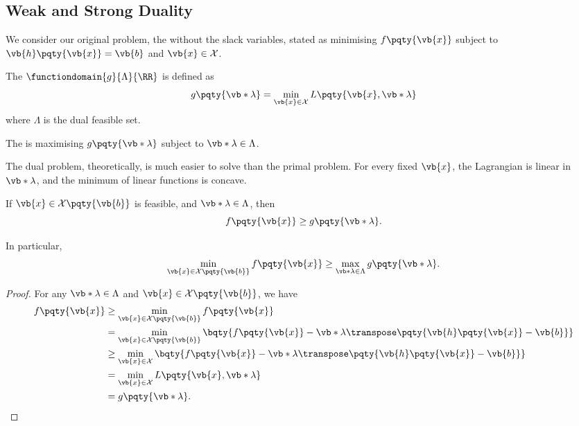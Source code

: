 \subsection{Weak and Strong Duality}

We consider our original problem, the  without the slack variables, stated as minimising \(f\pqty{\vb{x}}\) subject to \(\vb{h}\pqty{\vb{x}} = \vb{b}\) and \(\vb{x} \in \mathcal{X}\).

\begin{definition}
    The  \(\functiondomain{g}{\Lambda}{\RR}\) is defined as
    \[
        g\pqty{\vb*{\lambda}} = \min_{\vb{x} \in \mathcal{X}} L \pqty{\vb{x}, \vb*{\lambda}}
    \]
    where \(\Lambda\) is the dual feasible set.

    The  is maximising \(g\pqty{\vb*{\lambda}}\) subject to \(\vb*{\lambda} \in \Lambda\).
\end{definition}

\begin{remark}
    The dual problem, theoretically, is much easier to solve than the primal problem. For every fixed \(\vb{x}\), the Lagrangian is linear in \(\vb*{\lambda}\), and the minimum of linear functions is concave.
\end{remark}

\begin{theorem}
    \label{weak-duality}%
    If \(\vb{x} \in \mathcal{X} \pqty{\vb{b}}\) is feasible, and \(\vb*{\lambda} \in \Lambda\), then
    \[
        f\pqty{\vb{x}} \geq g\pqty{\vb*{\lambda}}.
    \]

    In particular,
    \[
        \min_{\vb{x} \in \mathcal{X} \pqty{\vb{b}}} f\pqty{\vb{x}} \geq \max_{\vb*{\lambda} \in \Lambda} g\pqty{\vb*{\lambda}}.
    \]
\end{theorem}

\begin{proof}
    For any \(\vb*{\lambda} \in \Lambda\) and \(\vb{x} \in \mathcal{X}\pqty{\vb{b}}\), we have
    \begin{align*}
        f\pqty{\vb{x}} &\geq \min_{\vb{x} \in \mathcal{X} \pqty{\vb{b}}} f\pqty{\vb{x}} \\
        &= \min_{\vb{x} \in \mathcal{X} \pqty{\vb{b}}} \bqty{f\pqty{\vb{x}} - \vb*{\lambda} \transpose \pqty{\vb{h}\pqty{\vb{x}} - \vb{b}}} \\
        &\geq \min_{\vb{x} \in \mathcal{X}} \bqty{f\pqty{\vb{x}} - \vb*{\lambda} \transpose \pqty{\vb{h}\pqty{\vb{x}} - \vb{b}}} \\
        &= \min_{\vb{x} \in \mathcal{X}} L\pqty{\vb{x}, \vb*{\lambda}} \\
        &= g\pqty{\vb*{\lambda}}.
    \end{align*}
\end{proof}

